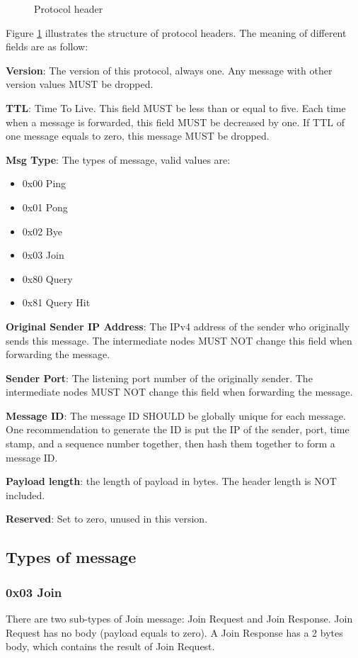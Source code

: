 \documentclass[12pt, a4paper]{article}
\begin{document}
\begin{figure}[h!]
  \centering
  \theverbbox
  \caption{Protocol header}
    \label{fig:header}
\end{figure}

Figure \ref{fig:header} illustrates the structure of protocol headers.
The meaning of different fields are as follow:

\textbf{Version}: The version of this protocol, always one.
Any message with other version values MUST be dropped.

\textbf{TTL}: Time To Live.
This field MUST be less than or equal to five.
Each time when a message is forwarded, this field MUST be decreased by one.
If TTL of one message equals to zero, this message MUST be dropped.

\textbf{Msg Type}: The types of message, valid values are:
\begin{itemize}
\item 0x00 Ping
\item 0x01 Pong
\item 0x02 Bye
\item 0x03 Join
\item 0x80 Query
\item 0x81 Query Hit
\end{itemize}

\textbf{Original Sender IP Address}: The IPv4 address of the sender who originally sends this message.
The intermediate nodes MUST NOT change this field when forwarding the message.

\textbf{Sender Port}: The listening port number of the originally sender.
The intermediate nodes MUST NOT change this field when forwarding the message.

\textbf{Message ID}: The message ID SHOULD be globally unique for each message. 
One recommendation to generate the ID is put the IP of the sender, port, time stamp, and a sequence number together, then hash them together to form a message ID.

\textbf{Payload length}: the length of payload in bytes.
The header length is NOT included.

\textbf{Reserved}: Set to zero, unused in this version.

\subsection{Types of message}
\subsubsection{0x03 Join}
There are two sub-types of Join message: Join Request and Join Response.
Join Request has no body (payload equals to zero).
A Join Response has a 2 bytes body, which contains the result of Join Request.
\end{document}
